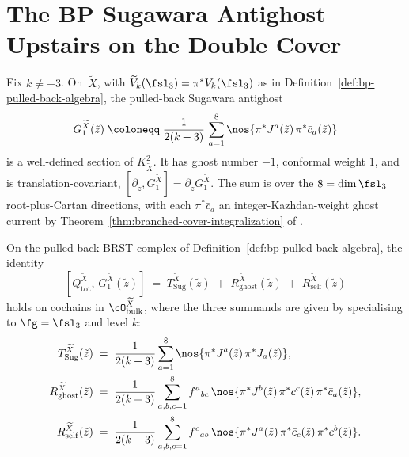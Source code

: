 \section{The BP Sugawara Antighost Upstairs on the Double Cover}
\label{sec:bp-sugawara-upstairs}

\begin{construction}
\label{constr:bp-G1-upstairs}
Fix $k \ne -3$. On~$\widetilde X$, with $\widetilde V_k(\fsl_3) =
\pi^{\ast}V_k(\fsl_3)$ as in Definition~\ref{def:bp-pulled-back-algebra},
the pulled-back Sugawara antighost
\begin{equation}\label{eq:bp-G1-upstairs}
 G_1^{\widetilde X}(\tilde z)
 \;\coloneqq\;
 \frac{1}{2(k+3)}\,
 \sum_{a=1}^{8}
 \nos{\pi^{\ast}J^{a}(\tilde z)\, \pi^{\ast}\bar c_{a}(\tilde z)}
\end{equation}
is a well-defined section of $K_{\widetilde X}^{2}$. It has ghost
number $-1$, conformal weight $1$, and is translation-covariant,
$[\partial_{\tilde z}, G_1^{\widetilde X}] = \partial_{\tilde z}G_1^{\widetilde X}$.
The sum is over the $8 = \dim \fsl_3$ root-plus-Cartan
directions, with each $\pi^{\ast}\bar c_a$ an integer-Kazhdan-weight
ghost current by Theorem~\ref{thm:branched-cover-integralization}
of \cite[\S\ref*{subsec:branched-cover}]{Vol2-fractional-ghost-platonic}.
\end{construction}

\begin{proposition}
\label{prop:bp-QG1-remainder-upstairs}
\ClaimStatusProvedHere
On the pulled-back BRST complex of
Definition~\ref{def:bp-pulled-back-algebra}, the identity
\begin{equation}\label{eq:bp-QG1-decomposition}
 [Q_{\mathrm{tot}}^{\widetilde X},\, G_1^{\widetilde X}(\tilde z)]
 \;=\; T_{\mathrm{Sug}}^{\widetilde X}(\tilde z)
 \;+\; R_{\mathrm{ghost}}^{\widetilde X}(\tilde z)
 \;+\; R_{\mathrm{self}}^{\widetilde X}(\tilde z)
\end{equation}
holds on cochains in $\cO_{\mathrm{bulk}}^{\widetilde X}$, where
the three summands are given by specialising
\cite[equations \texttt{eq:T-sug}--\texttt{eq:R-self}]{Vol1-class-L-antighost}
to $\fg = \fsl_3$ and level $k$:
\begin{align}
 T_{\mathrm{Sug}}^{\widetilde X}(\tilde z)
 &\;=\; \frac{1}{2(k+3)}
 \sum_{a=1}^{8} \nos{\pi^{\ast}J^{a}(\tilde z)\,\pi^{\ast}J_a(\tilde z)},
 \label{eq:bp-T-sug-upstairs}\\
 R_{\mathrm{ghost}}^{\widetilde X}(\tilde z)
 &\;=\; \frac{1}{2(k+3)}
 \sum_{a,b,c=1}^{8} f^{a}{}_{bc}\,
 \nos{\pi^{\ast}J^{b}(\tilde z)\,\pi^{\ast}c^{c}(\tilde z)\,\pi^{\ast}\bar c_{a}(\tilde z)},
 \label{eq:bp-R-ghost-upstairs}\\
 R_{\mathrm{self}}^{\widetilde X}(\tilde z)
 &\;=\; \frac{1}{2(k+3)}
 \sum_{a,b,c=1}^{8} f^{c}{}_{ab}\,
 \nos{\pi^{\ast}J^{a}(\tilde z)\,\pi^{\ast}\bar c_{c}(\tilde z)\,\pi^{\ast}c^{b}(\tilde z)}.
 \label{eq:bp-R-self-upstairs}
\end{align}
\end{proposition}

